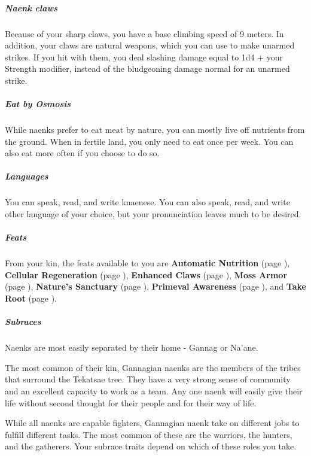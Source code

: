     \subparagraph{Naenk claws} Because of your sharp claws, you have a base climbing speed of 9 meters.
    In addition, your claws are natural weapons, which you can use to make unarmed strikes.
    If you hit with them, you deal slashing damage equal to 1d4 + your Strength modifier, instead of the bludgeoning damage normal for an unarmed strike.

    \subparagraph{Eat by Osmosis} While naenks prefer to eat meat by nature, you can mostly live off nutrients from the ground.
    When in fertile land, you only need to eat once per week.
    You can also eat more often if you choose to do so.

    \subparagraph{Languages} You can speak, read, and write knaenese.
    You can also speak, read, and write other language of your choice, but your pronunciation leaves much to be desired.


    \subparagraph{Feats} From your kin, the feats available to you are
    \textbf{Automatic Nutrition} (page \pageref{feat::automaticnutrition}),
    \textbf{Cellular Regeneration} (page \pageref{feat::cellularregeneration}),
    \textbf{Enhanced Claws} (page \pageref{feat::enhancedclaws}),
    \textbf{Moss Armor} (page \pageref{feat::mossarmor}),
    \textbf{Nature's Sanctuary} (page \pageref{feat::naturessanctuary}),
    \textbf{Primeval Awareness} (page \pageref{feat::primevalawareness}), and
    \textbf{Take Root} (page \pageref{feat::takeroot}).

    \subparagraph{Subraces} Naenks are most easily separated by their home - Gannag or Na'ane.

    The most common of their kin, Gannagian naenks are the members of the tribes that surround the Tekatsae tree.
    They have a very strong sense of community and an excellent capacity to work as a team.
    Any one naenk will easily give their life without second thought for their people and for their way of life.

    While all naenks are capable fighters, Gannagian naenk take on different jobs to fulfill different tasks.
    The most common of these are the warriors, the hunters, and the gatherers.
    Your subrace traits depend on which of these roles you take.


